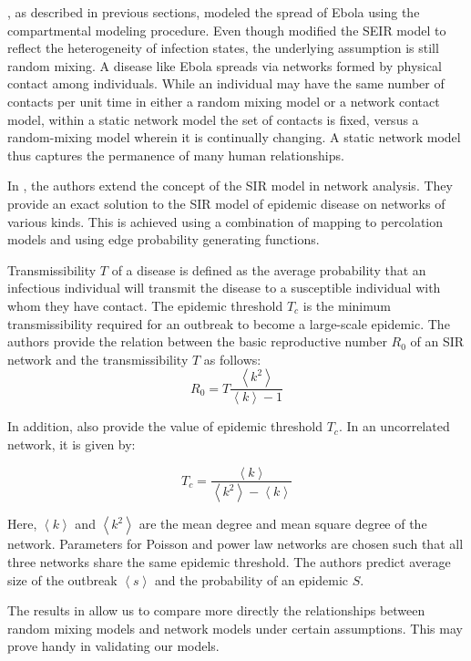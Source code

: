 \documentclass[10pt, journal,onecolumn]{IEEEtran}
\begin{document}
\citep{chowell2004basic, legrand2007understanding}, as described in previous sections, modeled the spread of Ebola using the
compartmental modeling procedure. Even though \citep{legrand2007understanding} modified the
SEIR model to reflect the heterogeneity of infection states, the underlying assumption is still
random mixing. A disease like Ebola spreads via networks formed by physical contact among individuals.
While an individual may have the same number of contacts per unit
time in either a random mixing model or a network contact model, within a static network model the set of
contacts is fixed, versus a random-mixing model wherein it is continually changing.
A static network model thus captures the permanence of many human relationships.

In \citep{newman2002spread}, the authors extend the concept of the SIR model in network analysis.
They provide an exact solution to the SIR model of epidemic disease on networks of various kinds.
This is achieved using a combination of mapping to percolation models and using edge probability generating functions.

Transmissibility $T$ of a disease is defined as the average probability that an infectious
individual will transmit the disease to a susceptible individual with whom they have contact.
The epidemic threshold $T_c$ is the minimum transmissibility required for an outbreak to become
a large-scale epidemic. The authors provide the relation between the basic reproductive number
$R_0$ of an SIR network and the transmissibility $T$ as follows:
\[
R_0 = T  \dfrac{\left\langle k^2 \right\rangle}{\left\langle k \right\rangle-1}
\]

In addition, \citep{newman2002spread} also provide the value of epidemic threshold $T_c$.  In an uncorrelated network, it is given by:

\[
T_c =\dfrac{\left\langle k \right\rangle}{\left\langle k^2 \right\rangle - \left\langle k \right\rangle}
\]

Here, $\left\langle k \right\rangle$ and $\left\langle k^2 \right\rangle$ are the mean degree and
mean square degree of the network. Parameters for Poisson and power law networks are chosen such
that all three networks share the same epidemic threshold. The authors predict average size
of the outbreak $\left\langle s \right\rangle$ and the probability of an epidemic $S$.

The results in \citep{newman2002spread} allow us to compare more directly the relationships between
random mixing models and network models under certain assumptions. This may prove handy in
validating our models.
\end{document}
